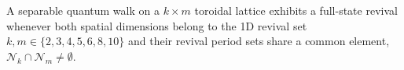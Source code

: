 \begin{corollary}[2D existence]
\label{cor:2d-existence}
A separable quantum walk on a $k \times m$ toroidal lattice
exhibits a full-state revival whenever both spatial
dimensions belong to the 1D revival set $k, m \in \{2, 3,
4, 5, 6, 8, 10\}$ and their revival period sets share a
common element, $\mathcal{N}_k \cap \mathcal{N}_m \neq
\emptyset$.
\end{corollary}
